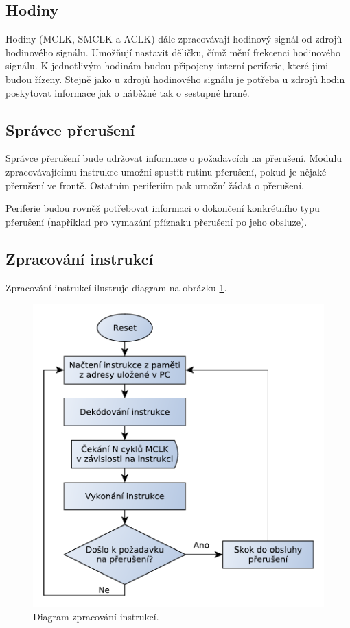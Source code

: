 \subsection{Hodiny}

Hodiny (MCLK, SMCLK a ACLK) dále zpracovávají hodinový signál od zdrojů hodinového signálu. Umožňují nastavit děličku, čímž mění frekcenci hodinového signálu. K jednotlivým hodinám budou připojeny interní periferie, které jimi budou řízeny. Stejně jako u zdrojů hodinového signálu je potřeba u zdrojů hodin poskytovat informace jak o náběžné tak o sestupné hraně.

\subsection{Správce přerušení}

Správce přerušení bude udržovat informace o požadavcích na přerušení. Modulu zpracovávajícímu instrukce umožní spustit rutinu přerušení, pokud je nějaké
přerušení ve frontě. Ostatním periferiím pak umožní žádat o přerušení.

Periferie budou rovněž potřebovat informaci o dokončení konkrétního typu přerušení (například pro vymazání příznaku přerušení po jeho obsluze).

\subsection{Zpracování instrukcí}

Zpracování instrukcí ilustruje diagram na obrázku \ref{fig:msp430_inst}.

\begin{figure}[h]
\centering
\includegraphics[trim=0cm 0cm 0cm 0cm, scale=0.7]{fig/msp430_inst}
\caption{Diagram zpracování instrukcí.}
\label{fig:msp430_inst}
\end{figure}

